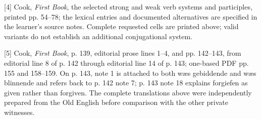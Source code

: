 [4] Cook, \emph{First Book}, the selected strong and weak verb systems and participles, printed pp. 54–78; the lexical entries and documented alternatives are specified in the learner's source notes. Complete requested cells are printed above; valid variants do not establish an additional conjugational system.

[5] Cook, \emph{First Book}, p. 139, editorial prose lines 1–4, and pp. 142–143, from editorial line 8 of p. 142 through editorial line 14 of p. 143; one-based PDF pp. 155 and 158–159. On p. 143, note 1 is attached to both wæs gebiddende and wæs blinnende and refers back to p. 142 note 7; p. 143 note 18 explains forgiefen as given rather than forgiven. The complete translations above were independently prepared from the Old English before comparison with the other private witnesses.

\endgroup

